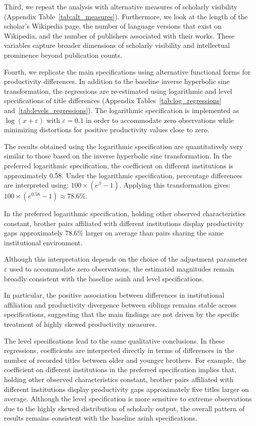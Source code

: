 Third, we repeat the analysis with alternative measures of scholarly visibility (Appendix Table~\ref{tab:alt_measures}). Furthermore, we look at the length of the scholar's Wikipedia page, the number of language versions that exist on Wikipedia, and the number of publishers associated with their works. These variables capture broader dimensions of scholarly visibility and intellectual prominence beyond publication counts. 

Fourth, we replicate the main specifications using alternative functional forms for productivity differences. In addition to the baseline inverse hyperbolic sine transformation, the regressions are re-estimated using logarithmic and level specifications of title differences (Appendix Tables~\ref{tab:log_regressions} and~\ref{tab:levels_regressions}). The logarithmic specification is implemented as $\log(x + \varepsilon)$ with $\varepsilon = 0.1$ in order to accommodate zero observations while minimizing distortions for positive productivity values close to zero.

The results obtained using the logarithmic specification are quantitatively very similar to those based on the inverse hyperbolic sine transformation. In the preferred logarithmic specification, the coefficient on different institutions is approximately 0.58. Under the logarithmic specification, percentage differences are interpreted using: $100 \times \left(e^{\beta}-1\right)$. Applying this transformation gives: $100 \times \left(e^{0.58}-1\right) \approx 78.6\%$.

In the preferred logarithmic specification, holding other observed characteristics constant, brother pairs affiliated with different institutions display productivity gaps approximately 78.6\% larger on average than pairs sharing the same institutional environment.

Although this interpretation depends on the choice of the adjustment parameter $\varepsilon$ used to accommodate zero observations, the estimated magnitudes remain broadly consistent with the baseline asinh and level specifications.

In particular, the positive association between differences in institutional affiliation and productivity divergence between siblings remains stable across specifications, suggesting that the main findings are not driven by the specific treatment of highly skewed productivity measures.

The level specifications lead to the same qualitative conclusions. In these regressions, coefficients are interpreted directly in terms of differences in the number of recorded titles between older and younger brothers. For example, the coefficient on different institutions in the preferred specification implies that, holding other observed characteristics constant, brother pairs affiliated with different institutions display productivity gaps approximately five titles larger on average. Although the level specification is more sensitive to extreme observations due to the highly skewed distribution of scholarly output, the overall pattern of results remains consistent with the baseline asinh specifications.

